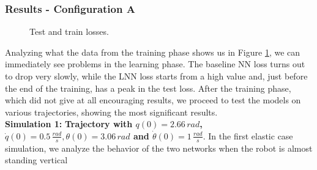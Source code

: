 \documentclass[a4paper]{article}
\begin{document}
\subsubsection{Results - Configuration A}
\begin{figure}
    \centering
    \qquad
    \caption{Test and train losses.}
    \label{fig:elastic_losses_300_2}
\end{figure}

Analyzing what the data from the training phase shows us in Figure \ref{fig:elastic_losses_300_2}, we can immediately see problems in the learning phase. The baseline NN loss turns out to drop very slowly, while the LNN loss starts from a high value and, just before the end of the training, has a peak in the test loss. After the training phase, which did not give at all encouraging results, we proceed to test the models on various trajectories, showing the most significant results.\\

\textbf{Simulation 1:} \textbf{Trajectory with $q(0)=2.66\, rad$, $\dot{q}(0)=0.5\, \frac{rad}{s}, \theta(0)=3.06\, rad$ and $\dot{\theta}(0)=1\, \frac{rad}{s}.$}
In the first elastic case simulation, we analyze the behavior of the two networks when the robot is almost standing vertical
\end{document}
